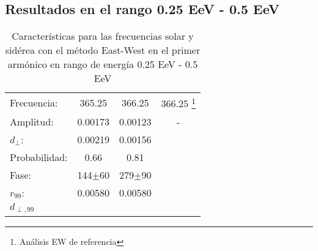 \subsection*{Resultados en el rango 0.25 EeV - 0.5 EeV}
\begin{table}[H]
    \begin{small}
        \begin{center}
            \begin{tabular}[c]{l|c|c|c}
                Frecuencia:     & 365.25	  & 366.25	   & 366.25 \footnote{Análisis EW de referencia}   \\
                Amplitud:       & 0.00173	  & 0.00123	   & -      \\
                $d_\perp$:      & 0.00219	  & 0.00156	   &        \\
                Probabilidad:   & 0.66        & 0.81	   &        \\
                Fase:           & 144$\pm$60  & 279$\pm$90 &    	\\
                $r_{99}$:       & 0.00580	  & 0.00580    &        \\
                $d_{\perp,99}$  &             &\\
            \end{tabular}
        \end{center}
    \end{small}
    \caption{Características para las frecuencias solar y sidérea con el método East-West en el primer armónico en rango de energía 0.25 EeV - 0.5 EeV}
    \label{tab:solar}
\end{table}

